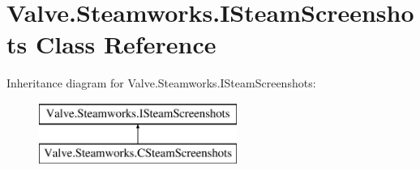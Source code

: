 \hypertarget{classValve_1_1Steamworks_1_1ISteamScreenshots}{}\section{Valve.\+Steamworks.\+I\+Steam\+Screenshots Class Reference}
\label{classValve_1_1Steamworks_1_1ISteamScreenshots}
Inheritance diagram for Valve.\+Steamworks.\+I\+Steam\+Screenshots\+:\begin{figure}[H]
\begin{center}
\leavevmode
\includegraphics[height=2.000000cm]{classValve_1_1Steamworks_1_1ISteamScreenshots}
\end{center}
\end{figure}
